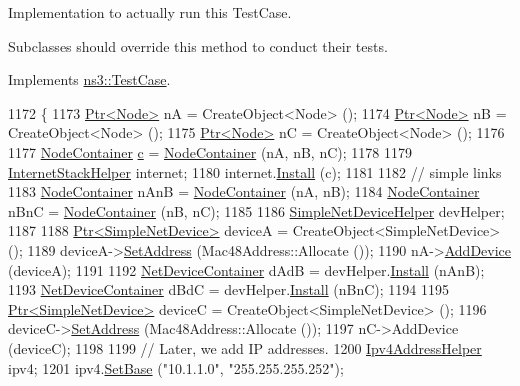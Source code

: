 Implementation to actually run this Test\+Case. 

Subclasses should override this method to conduct their tests. 

Implements \hyperlink{classns3_1_1TestCase_a8ff74680cf017ed42011e4be51917a24}{ns3\+::\+Test\+Case}.


\begin{DoxyCode}
1172 \{
1173   \hyperlink{classns3_1_1Ptr}{Ptr<Node>} nA = CreateObject<Node> ();
1174   \hyperlink{classns3_1_1Ptr}{Ptr<Node>} nB = CreateObject<Node> ();
1175   \hyperlink{classns3_1_1Ptr}{Ptr<Node>} nC = CreateObject<Node> ();
1176 
1177   \hyperlink{classns3_1_1NodeContainer}{NodeContainer} \hyperlink{lte_2model_2fading-traces_2fading__trace__generator_8m_ae0323a9039add2978bf5b49550572c7c}{c} = \hyperlink{classns3_1_1NodeContainer}{NodeContainer} (nA, nB, nC);
1178 
1179   \hyperlink{classns3_1_1InternetStackHelper}{InternetStackHelper} internet;
1180   internet.\hyperlink{classns3_1_1InternetStackHelper_a6645b412f31283d2d9bc3d8a95cebbc0}{Install} (c);
1181 
1182   \textcolor{comment}{// simple links}
1183   \hyperlink{classns3_1_1NodeContainer}{NodeContainer} nAnB = \hyperlink{classns3_1_1NodeContainer}{NodeContainer} (nA, nB);
1184   \hyperlink{classns3_1_1NodeContainer}{NodeContainer} nBnC = \hyperlink{classns3_1_1NodeContainer}{NodeContainer} (nB, nC);
1185 
1186   \hyperlink{classns3_1_1SimpleNetDeviceHelper}{SimpleNetDeviceHelper} devHelper;
1187 
1188   \hyperlink{classns3_1_1Ptr}{Ptr<SimpleNetDevice>} deviceA = CreateObject<SimpleNetDevice> ();
1189   deviceA->\hyperlink{classns3_1_1SimpleNetDevice_a968ef3e7318bac29d5f1d7d977029af4}{SetAddress} (Mac48Address::Allocate ());
1190   nA->\hyperlink{classns3_1_1Node_a42ff83ee1d5d1649c770d3f5b62375de}{AddDevice} (deviceA);
1191 
1192   \hyperlink{classns3_1_1NetDeviceContainer}{NetDeviceContainer} dAdB = devHelper.\hyperlink{classns3_1_1SimpleNetDeviceHelper_a35bed9cee32d306362d3e24dfeef4513}{Install} (nAnB);
1193   \hyperlink{classns3_1_1NetDeviceContainer}{NetDeviceContainer} dBdC = devHelper.\hyperlink{classns3_1_1SimpleNetDeviceHelper_a35bed9cee32d306362d3e24dfeef4513}{Install} (nBnC);
1194 
1195   \hyperlink{classns3_1_1Ptr}{Ptr<SimpleNetDevice>} deviceC = CreateObject<SimpleNetDevice> ();
1196   deviceC->\hyperlink{classns3_1_1SimpleNetDevice_a968ef3e7318bac29d5f1d7d977029af4}{SetAddress} (Mac48Address::Allocate ());
1197   nC->AddDevice (deviceC);
1198 
1199   \textcolor{comment}{// Later, we add IP addresses.}
1200   \hyperlink{classns3_1_1Ipv4AddressHelper}{Ipv4AddressHelper} ipv4;
1201   ipv4.\hyperlink{classns3_1_1Ipv4AddressHelper_acf7b16dd25bac67e00f5e25f90a9a035}{SetBase} (\textcolor{stringliteral}{"10.1.1.0"}, \textcolor{stringliteral}{"255.255.255.252"});

\end{DoxyCode}
